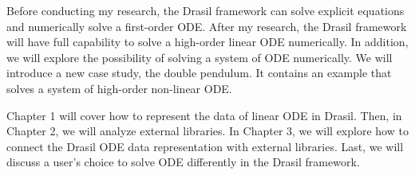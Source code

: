 Before conducting my research, the Drasil framework can solve explicit equations and numerically solve a first-order ODE. After my research, the Drasil framework will have full capability to solve a high-order linear ODE numerically. In addition, we will explore the possibility of solving a system of ODE numerically. We will introduce a new case study, the double pendulum. It contains an example that solves a system of high-order non-linear ODE.

Chapter 1 will cover how to represent the data of linear ODE in Drasil. Then, in Chapter 2, we will analyze external libraries. In Chapter 3, we will explore how to connect the Drasil ODE data representation with external libraries. Last, we will discuss a user's choice to solve ODE differently in the Drasil framework.